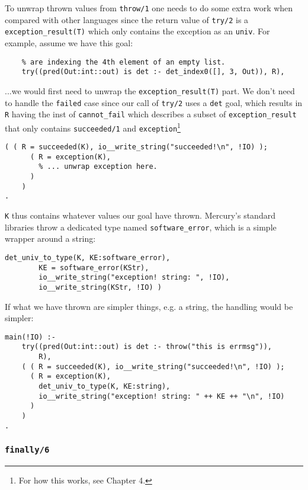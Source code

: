   To unwrap thrown values from \texttt{throw/1} one needs to do some extra work when compared with other languages since the return value of \texttt{try/2} is a \texttt{exception_result(T)} which only contains the exception as an \texttt{univ}. For example, assume we have this goal:

\begin{lstlisting}[language=Mercury]
    % this goal would definitely throw an exception since we
    % are indexing the 4th element of an empty list.
	try((pred(Out:int::out) is det :- det_index0([], 3, Out)), R),
\end{lstlisting}

...we would first need to unwrap the \texttt{exception_result(T)} part. We don't need to handle the \texttt{failed} case since our call of \texttt{try/2} uses a \texttt{det} goal, which results in \texttt{R} having the inst of \texttt{cannot_fail} which describes a subset of \texttt{exception_result} that only contains \texttt{succeeded/1} and \texttt{exception}\footnote{For how this works, see Chapter 4.}
\begin{lstlisting}[language=Mercury]
	( ( R = succeeded(K), io__write_string("succeeded!\n", !IO) );
	  ( R = exception(K),
        % ... unwrap exception here.
      )
	)
.
\end{lstlisting}

\texttt{K} thus contains whatever values our goal have thrown. Mercury's standard libraries throw a dedicated type named \texttt{software_error}, which is a simple wrapper around a string:

\begin{lstlisting}[language=Mercury]
		det_univ_to_type(K, KE:software_error),
		KE = software_error(KStr),
		io__write_string("exception! string: ", !IO),
		io__write_string(KStr, !IO) )
\end{lstlisting}

If what we have thrown are simpler things, e.g. a string, the handling would be simpler:

\begin{lstlisting}[language=Mercury]
main(!IO) :-
	try((pred(Out:int::out) is det :- throw("this is errmsg")),
		R),
	( ( R = succeeded(K), io__write_string("succeeded!\n", !IO) );
	  ( R = exception(K),
		det_univ_to_type(K, KE:string),
		io__write_string("exception! string: " ++ KE ++ "\n", !IO)
	  )
	)
.
\end{lstlisting}

\subsubsection{\texttt{finally/6}}

